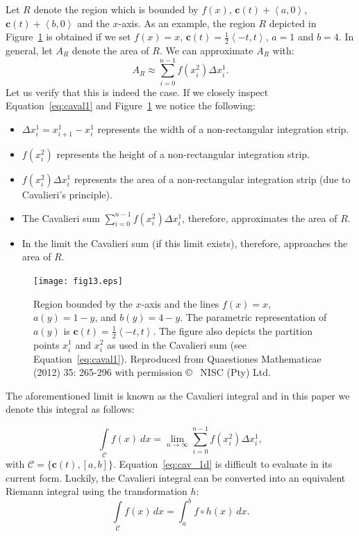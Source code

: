 \documentclass{article}
\theoremstyle{theorem}
\theoremstyle{definition}
\begin{document}
\noindent
Let $R$ denote the region which is bounded by $f(x)$, $\mathbf{c}(t)+\left <a,0\right >$, $\mathbf{c}(t)+\left <b,0\right >$ and the $x$-axis. 
As an example, the region $R$ depicted in Figure~\ref{fig:caval2} is obtained if we set $f(x) = x$, $\mathbf{c}(t) = \frac{1}{2}\left<- t, t\right>$, $a = 1$ and $b = 4$.
In general, let $A_R$ denote the area of $R$. We can approximate $A_R$ with:
\begin{equation}
 \label{eq:caval1}
 A_R \approx \sum_{i=0}^{n-1} f(x_i^2)\Delta x_i^1.
 \end{equation}
Let us verify that this is indeed the case. If we closely inspect Equation~\ref{eq:caval1} and Figure~\ref{fig:caval2} we notice the following:
 \begin{itemize}
  \item $\Delta x_i^1 = x_{i+1}^1 - x_i^1$ represents the width of a non-rectangular integration strip.
  \item $f(x_i^2)$ represents the height of a non-rectangular integration strip.
  \item $f(x_i^2)\Delta x_i^1$ represents the area of a non-rectangular integration strip (due to Cavalieri's principle).
  \item The Cavalieri sum $\sum_{i=0}^{n-1} f(x_i^2)\Delta x_i^1$, therefore, approximates the area of $R$.
  \item In the limit the Cavalieri sum (if this limit exists), therefore, approaches the area of $R$.
 \end{itemize}

\begin{figure}[htb]
\centering
\texttt{[image: fig13.eps]}
\caption{Region bounded by the $x$-axis and the lines $f(x)=x$, $a(y)=1-y$, and $b(y)=4-y$. The parametric representation of $a(y)$ is $\mathbf{c}(t) = \frac{1}{2} \left <-t,t \right >$. The figure also depicts the partition points $x_i^1$ and $x_i^2$ as used in the Cavalieri sum (see Equation~\eqref{eq:caval1}). Reproduced from Quaestiones Mathematicae (2012) 35: 265-296 with permission \copyright~ NISC (Pty) Ltd.}
\label{fig:caval2}
\end{figure}

\noindent
The aforementioned limit is known as the Cavalieri integral and in this paper we denote this integral as follows:

\begin{equation}
\label{eq:cav_1d}
\int \limits_{\mathcal{C}} f(x)~dx = \lim_{n \rightarrow \infty}  \sum_{i=0}^{n-1} f(x_i^2) \Delta x_i^1,
\end{equation}
with $\mathcal{C} = \{\mathbf{c}(t),[a,b]\}$. Equation~\eqref{eq:cav_1d} is difficult to evaluate in its current form. Luckily, the Cavalieri integral 
can be converted into an equivalent Riemann integral using the transformation $h$:
 \begin{equation}
 \int \limits_{\mathcal{C}} f(x)\, dx = \int_{a}^{b} f\circ h(x)~dx. 
\end{equation}
\end{document}
